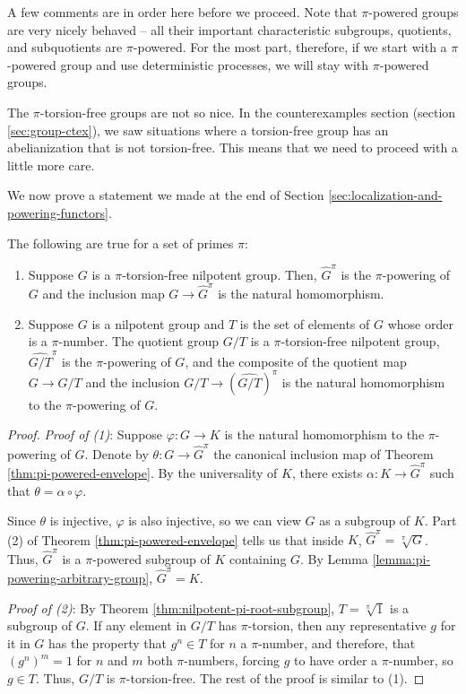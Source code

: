 A few comments are in order here before we proceed. Note that
$\pi$-powered groups are very nicely behaved -- all their important
characteristic subgroups, quotients, and subquotients are
$\pi$-powered. For the most part, therefore, if we start with a
$\pi$-powered group and use deterministic processes, we will stay with
$\pi$-powered groups.

The $\pi$-torsion-free groups are not so nice. In the counterexamples
section (section \ref{sec:group-ctex}), we saw situations where a
torsion-free group has an abelianization that is not
torsion-free. This means that we need to proceed with a little more
care.

We now prove a statement we made at the end of Section
\ref{sec:localization-and-powering-functors}.

\begin{theorem}
  The following are true for a set of primes $\pi$:

  \begin{enumerate}
  \item Suppose $G$ is a $\pi$-torsion-free nilpotent group. Then,
    $\hat{G}^\pi$ is the $\pi$-powering of $G$ and the inclusion map
    $G \to \hat{G}^\pi$ is the natural homomorphism.
  \item Suppose $G$ is a nilpotent group and $T$ is the set of
    elements of $G$ whose order is a $\pi$-number. The quotient group
    $G/T$ is a $\pi$-torsion-free nilpotent group, $\hat{G/T}^\pi$ is
    the $\pi$-powering of $G$, and the composite of the quotient map $G
    \to G/T$ and the inclusion $G/T \to (\hat{G/T})^\pi$ is the
    natural homomorphism to the $\pi$-powering of $G$.
  \end{enumerate}
\end{theorem}

\begin{proof}
  {\em Proof of (1)}: Suppose $\varphi:G \to K$ is the natural
  homomorphism to the $\pi$-powering of $G$. Denote by $\theta: G \to
  \hat{G}^\pi$ the canonical inclusion map of Theorem
  \ref{thm:pi-powered-envelope}. By the universality of $K$, there exists
  $\alpha:K \to \hat{G}^\pi$ such that $\theta = \alpha \circ
  \varphi$.

  Since $\theta$ is injective, $\varphi$ is also injective, so we can
  view $G$ as a subgroup of $K$. Part (2) of Theorem
  \ref{thm:pi-powered-envelope} tells us that inside $K$, $\hat{G}^\pi =
  \sqrt[\pi]{G}$. Thus, $\hat{G}^\pi$ is a $\pi$-powered subgroup of
  $K$ containing $G$. By Lemma
  \ref{lemma:pi-powering-arbitrary-group}, $\hat{G}^\pi = K$.

  {\em Proof of (2)}: By Theorem \ref{thm:nilpotent-pi-root-subgroup}, $T
  = \sqrt[\pi]{1}$ is a subgroup of $G$. If any element in $G/T$ has
  $\pi$-torsion, then any representative $g$ for it in $G$ has the
  property that $g^n \in T$ for $n$ a $\pi$-number, and therefore,
  that $(g^n)^m = 1$ for $n$ and $m$ both $\pi$-numbers, forcing $g$
  to have order a $\pi$-number, so $g \in T$. Thus, $G/T$ is
  $\pi$-torsion-free. The rest of the proof is similar to (1).
\end{proof}

